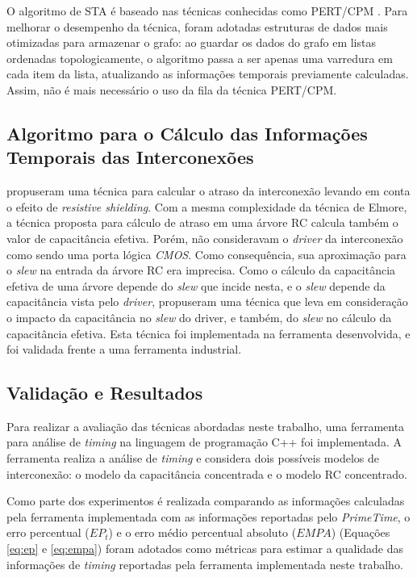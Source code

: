 \documentclass[
	12pt,				%
	openright,			%
	twoside,			%
	a4paper,			%
	english,			%
	french,				%
	spanish,			%
	brazil,				%
	]{abntex2}
\begin{document}
O algoritmo de STA é baseado nas técnicas conhecidas como PERT/CPM \cite{BhaskerChadha09}. Para melhorar o desempenho da técnica, foram adotadas estruturas de dados mais otimizadas para armazenar o grafo: ao guardar os dados do grafo em listas ordenadas topologicamente, o algoritmo passa a ser apenas uma varredura em cada item da lista, atualizando as informações temporais previamente calculadas. Assim, não é mais necessário o uso da fila da técnica PERT/CPM.

\subsection{Algoritmo para o Cálculo das Informações Temporais das Interconexões}

 propuseram uma técnica para calcular o atraso da interconexão levando em conta o efeito de \textit{resistive shielding}. Com a mesma complexidade da técnica de Elmore, a técnica proposta para cálculo de atraso em uma árvore RC calcula também o valor de capacitância efetiva. Porém,  não consideravam o \textit{driver} da interconexão como sendo uma porta lógica \textit{CMOS}. Como consequência, sua aproximação para o \textit{slew} na entrada da árvore RC era imprecisa. Como o cálculo da capacitância efetiva de uma árvore depende do \textit{slew} que incide nesta, e o \textit{slew} depende da capacitância vista pelo \textit{driver},  propuseram uma técnica que leva em consideração o impacto da capacitância no \textit{slew} do driver, e também, do \textit{slew} no cálculo da capacitância efetiva. Esta técnica foi implementada na ferramenta desenvolvida, e foi validada frente a uma ferramenta industrial.

\subsection{Validação e Resultados}

Para realizar a avaliação das técnicas abordadas neste trabalho, uma ferramenta para análise de \textit{timing} na linguagem de programação C++ foi implementada. A ferramenta realiza a análise de \textit{timing} e considera dois possíveis modelos de interconexão: o modelo da capacitância concentrada e o modelo RC concentrado.

Como parte dos experimentos é realizada comparando as informações calculadas pela ferramenta implementada com as informações reportadas pelo \textit{PrimeTime}, o erro percentual ($EP_t$) e o erro médio percentual absoluto ($EMPA$) (Equações \ref{eq:ep} e \ref{eq:empa}) foram adotados como métricas para estimar a qualidade das informações de \textit{timing} reportadas pela ferramenta implementada neste trabalho.
\end{document}
